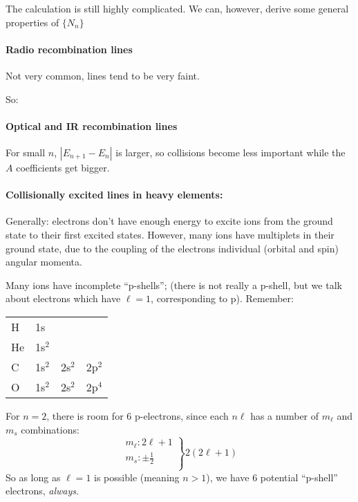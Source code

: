 \documentclass[11pt]{article}
\newcommand{\mar}[1]{\hspace{0pt}\marginpar{-\textcolor{black}{#1}-}}
\begin{document}
\mar{71}The calculation is still highly complicated. We can, however,
derive some general properties of $\{N_{n}\}$

\paragraph{Radio recombination lines}
Not very common, lines tend to be very faint.

\mar{72}So:
\[
    \]

\paragraph{Optical and IR recombination lines}
For small $n$, $|E_{n+1} - E_{n}|$ is larger, so collisions become
less important while the $A$ coefficients get bigger.


\paragraph{Collisionally excited lines in heavy elements:}
\mar{79}Generally: electrons don't have enough energy to excite ions from
the ground state to their first excited states. However, many
ions have multiplets in their ground state, due to the coupling of
the electrons individual (orbital and spin) angular momenta.

Many ions have incomplete ``p-shells''; (there is not really a p-shell,
but we talk about electrons which have $\ell = 1$, corresponding to p).
Remember:

\begin{tabular}{l l l l}
    H & 1s\\
    He & 1s$^{2}$\\
    C & 1s$^{2}$ & 2s$^{2}$ & 2p$^{2}$\\
    O & 1s$^{2}$ & 2s$^{2}$ & 2p$^{4}$
\end{tabular}
For $n=2$, there is room for 6 p-electrons, since each $n\ell$ has
a number of $m_{\ell}$ and $m_{s}$ combinations:
\begin{equation*}
    \left.
        \begin{array}{l}
            m_{\ell}: 2\ell+1\\
            m_{s}: \pm \frac{1}{2}\\
        \end{array}
    \right\} 2(2\ell+1)
\end{equation*}
So as long as $\ell=1$ is possible (meaning $n>1$), we have 6 potential
``p-shell'' electrons, \emph{always}.
\end{document}
